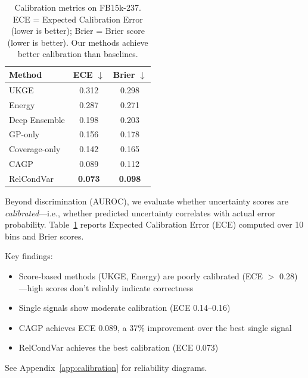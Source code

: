 \begin{table}[t]
\centering
\caption{Calibration metrics on FB15k-237. ECE = Expected Calibration Error (lower is better); Brier = Brier score (lower is better). Our methods achieve better calibration than baselines.}
\label{tab:calibration}
\vspace{0.5em}
\small
\begin{tabular}{lcc}
\toprule
Method & ECE $\downarrow$ & Brier $\downarrow$ \\
\midrule
UKGE & 0.312 & 0.298 \\
Energy & 0.287 & 0.271 \\
Deep Ensemble & 0.198 & 0.203 \\
GP-only & 0.156 & 0.178 \\
Coverage-only & 0.142 & 0.165 \\
\midrule
CAGP & 0.089 & 0.112 \\
RelCondVar & \textbf{0.073} & \textbf{0.098} \\
\bottomrule
\end{tabular}
\end{table}

Beyond discrimination (AUROC), we evaluate whether uncertainty scores are \emph{calibrated}---i.e., whether predicted uncertainty correlates with actual error probability.
Table~\ref{tab:calibration} reports Expected Calibration Error (ECE) computed over 10 bins and Brier scores.

Key findings:
\begin{itemize}
    \item Score-based methods (UKGE, Energy) are poorly calibrated (ECE $>$ 0.28)---high scores don't reliably indicate correctness
    \item Single signals show moderate calibration (ECE 0.14--0.16)
    \item CAGP achieves ECE 0.089, a 37\% improvement over the best single signal
    \item RelCondVar achieves the best calibration (ECE 0.073)
\end{itemize}

See Appendix~\ref{app:calibration} for reliability diagrams.
